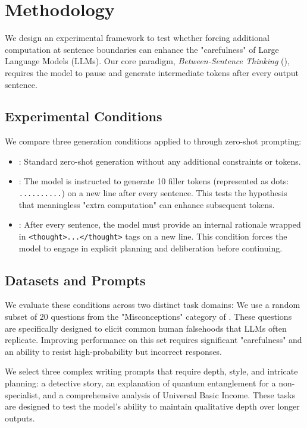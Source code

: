 \section{Methodology}
\label{sec:method}

We design an experimental framework to test whether forcing additional computation at sentence boundaries can enhance the "carefulness" of Large Language Models (LLMs). Our core paradigm, \textit{Between-Sentence Thinking} (\bst), requires the model to pause and generate intermediate tokens after every output sentence.

\subsection{Experimental Conditions}
We compare three generation conditions applied to \gpt through zero-shot prompting:
\begin{itemize}[leftmargin=*,itemsep=0pt,topsep=0pt]
    \item {\bf \control}: Standard zero-shot generation without any additional constraints or tokens.
    \item {\bf \bstfiller}: The model is instructed to generate 10 filler tokens (represented as dots: \texttt{..........}) on a new line after every sentence. This tests the hypothesis that meaningless "extra computation" can enhance subsequent tokens.
    \item {\bf \bstrationale}: After every sentence, the model must provide an internal rationale wrapped in \texttt{<thought>...</thought>} tags on a new line. This condition forces the model to engage in explicit planning and deliberation before continuing.
\end{itemize}

\subsection{Datasets and Prompts}
We evaluate these conditions across two distinct task domains:
 We use a random subset of 20 questions from the "Misconceptions" category of \tqa \cite{lin2022truthfulqa}. These questions are specifically designed to elicit common human falsehoods that LLMs often replicate. Improving performance on this set requires significant "carefulness" and an ability to resist high-probability but incorrect responses.

 We select three complex writing prompts that require depth, style, and intricate planning: a detective story, an explanation of quantum entanglement for a non-specialist, and a comprehensive analysis of Universal Basic Income. These tasks are designed to test the model's ability to maintain qualitative depth over longer outputs.

